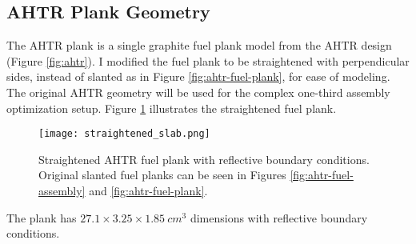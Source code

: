 \subsection{AHTR Plank Geometry}
The \gls{AHTR} plank is a single graphite fuel plank model from the \gls{AHTR} design (Figure 
\ref{fig:ahtr}). %
I modified the fuel plank to be straightened with perpendicular sides, instead 
of slanted as in Figure \ref{fig:ahtr-fuel-plank}, for ease of modeling. 
The original \gls{AHTR} geometry will be used for the complex one-third assembly optimization 
setup. 
Figure \ref{fig:straightened_plank} illustrates the straightened fuel plank.
\begin{figure}[]
    \centering
    \texttt{[image: straightened\_slab.png]}
    \raggedright
    \caption{Straightened \acrfull{AHTR} fuel plank with reflective boundary 
    conditions. Original slanted fuel planks can be seen in Figures 
    \ref{fig:ahtr-fuel-assembly} and \ref{fig:ahtr-fuel-plank}.}
    \label{fig:straightened_plank}
\end{figure}
The plank has $27.1 \times 3.25 \times 1.85\ cm^3$ dimensions with reflective 
boundary conditions.


